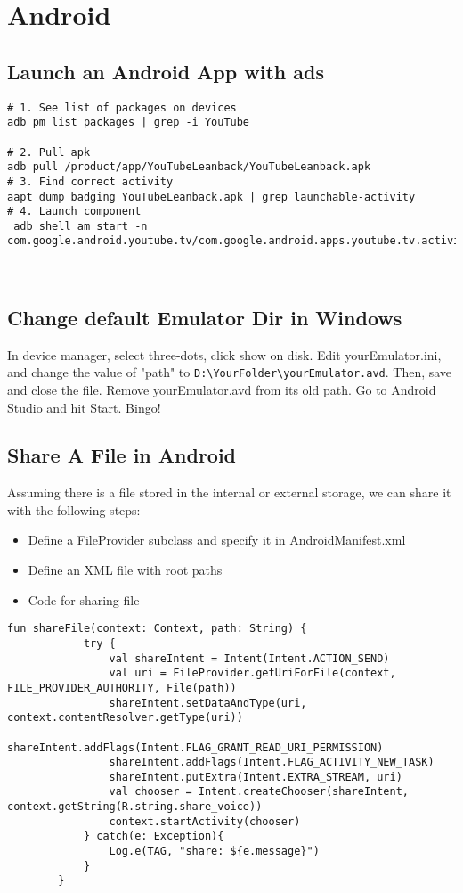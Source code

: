 \documentclass{article}
\begin{document}
\section{Android}
\subsection{Launch an Android App with ads}
\begin{verbatim}
# 1. See list of packages on devices
adb pm list packages | grep -i YouTube

# 2. Pull apk
adb pull /product/app/YouTubeLeanback/YouTubeLeanback.apk 
# 3. Find correct activity
aapt dump badging YouTubeLeanback.apk | grep launchable-activity
# 4. Launch component
 adb shell am start -n com.google.android.youtube.tv/com.google.android.apps.youtube.tv.activity.ShellActivity      

 
\end{verbatim}
\subsection{Change default Emulator Dir in Windows}
In device manager, select three-dots, click show on disk. Edit yourEmulator.ini, and change the value of "path" to \lstinline{D:\YourFolder\yourEmulator.avd}. Then, save and close the file. Remove yourEmulator.avd from its old path. Go to Android Studio and hit Start. Bingo!

\subsection{Share A File in Android}
Assuming there is a file stored in the internal or external storage, we can share it with the following steps:
\begin{itemize}
  \item Define a FileProvider subclass and specify it in AndroidManifest.xml
  \item Define an XML file with root paths
  \item Code for sharing file
\end{itemize}
\begin{verbatim}
fun shareFile(context: Context, path: String) {
            try {
                val shareIntent = Intent(Intent.ACTION_SEND)
                val uri = FileProvider.getUriForFile(context, FILE_PROVIDER_AUTHORITY, File(path))
                shareIntent.setDataAndType(uri, context.contentResolver.getType(uri))
                shareIntent.addFlags(Intent.FLAG_GRANT_READ_URI_PERMISSION)
                shareIntent.addFlags(Intent.FLAG_ACTIVITY_NEW_TASK)
                shareIntent.putExtra(Intent.EXTRA_STREAM, uri)
                val chooser = Intent.createChooser(shareIntent, context.getString(R.string.share_voice))
                context.startActivity(chooser)
            } catch(e: Exception){
                Log.e(TAG, "share: ${e.message}")
            }
        }
\end{verbatim}
\end{document}
